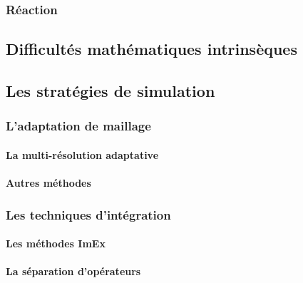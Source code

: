 \subsubsection{Réaction}

\subsection{Difficultés mathématiques intrinsèques}

\subsection{Les stratégies de simulation}
\subsubsection{L'adaptation de maillage}
    \paragraph{La multi-résolution adaptative}
    \paragraph{Autres méthodes}
\subsubsection{Les techniques d'intégration}
    \paragraph{Les méthodes ImEx}
    \paragraph{La séparation d'opérateurs}